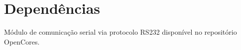 \documentclass{article}
\begin{document}
\section{Dependências}

  \begin{dependencies}
    {Módulo de comunicação serial via protocolo RS232 disponível no repositório OpenCores.}

\end{dependencies}  

% 
% 
\end{document}
